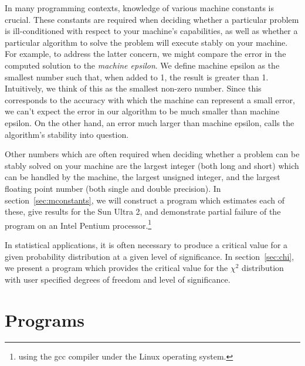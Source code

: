 \documentclass{article}
\begin{document}
In many programming contexts, knowledge of various machine constants
is crucial.  These constants are required when deciding 
whether a particular problem is ill-conditioned with respect to 
your machine's capabilities, as well as whether a particular 
algorithm to solve the problem will execute stably on your machine.
For example, to address the latter concern, we might compare the
error in the computed solution to the \emph{machine epsilon}.  We
define machine epsilon as the smallest number such that, when added to 1, 
the result is greater than 1.  Intuitively, we think of this as the
smallest non-zero number.  Since this corresponds to the accuracy
with which the machine can represent a small error, we can't expect 
the error in our algorithm to be much smaller than machine epsilon.
On the other hand, an error much larger than machine epsilon,
calls the algorithm's stability into question.

Other numbers which are often required when deciding whether a problem
can be stably solved on your machine are the largest integer 
(both long and short) which can be handled by the machine, 
the largest unsigned integer, and the largest floating point number 
(both single and double precision).  In section~\ref{sec:mconstants}, 
we will construct a program which estimates each of these, give
results for the Sun Ultra 2, and demonstrate partial failure of the 
program on an Intel Pentium processor.\footnote{using the gcc compiler
under the Linux operating system.}

In statistical applications, it is often necessary to produce a 
critical value for a given probability distribution at a given 
level of significance.  In section~\ref{sec:chi}, we present a 
program which provides the critical value for the $\chi^2$ 
distribution with user specified degrees of freedom and level 
of significance.


\section{Programs}
\label{sec:Programs}
\end{document}
